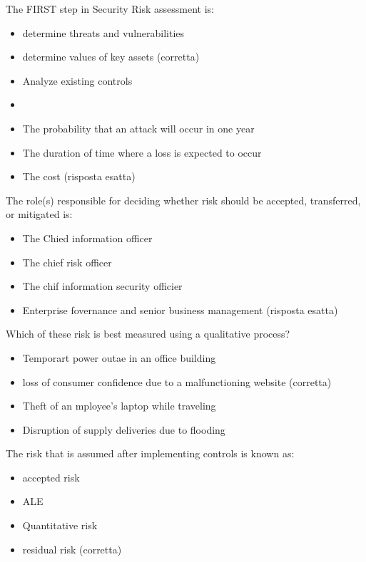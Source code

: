 The FIRST step in Security Risk assessment is:
\begin{itemize}
\item determine threats and vulnerabilities
\item determine values of key assets (corretta)
\item Analyze existing controls
\item 
\end{itemize}




\begin{itemize}
\item The probability that an attack will occur in one year
\item The duration of time where a loss is expected to occur
\item The cost (risposta esatta)
\end{itemize}


The role(s) responsible for deciding whether risk should be accepted, 
transferred, or mitigated is:
\begin{itemize}
\item The Chied information officer
\item The chief risk officer
\item The chif information security officier
\item Enterprise fovernance and senior business management (risposta esatta)
\end{itemize}


Which of these risk is best measured using a qualitative process?
\begin{itemize}
\item Temporart power outae in an office building
\item loss of consumer confidence due to a malfunctioning website (corretta)
\item Theft of an mployee's laptop while traveling
\item Disruption of supply deliveries due to flooding
\end{itemize}

The risk that is assumed after implementing controls is known as:

\begin{itemize}
\item accepted risk
\item ALE
\item Quantitative risk
\item residual risk (corretta)
\end{itemize}

